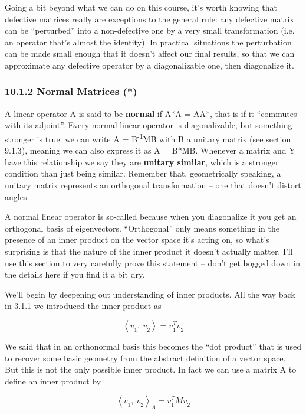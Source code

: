 \documentclass[oneside,english]{amsbook}
\numberwithin{section}{chapter}
\theoremstyle{plain}
\theoremstyle{definition}
\begin{document}
Going a bit beyond what we can do on this course, it's worth knowing
that defective matrices really are exceptions to the general rule: any
defective matrix can be ``perturbed'' into a non-defective one by a very
small transformation (i.e. an operator that's almost the identity). In
practical situations the perturbation can be made small enough that it
doesn't affect our final results, so that we can approximate any
defective operator by a diagonalizable one, then diagonalize it.

\subsubsection{10.1.2 Normal Matrices (*)}\label{normal-matrices}

A linear operator A is said to be \textbf{normal} if A*A = AA*, that is
if it ``commutes with its adjoint''. Every normal linear operator is
diagonalizable, but something stronger is true: we can write A =
B\textsuperscript{-1}MB with B a unitary matrix (see section 9.1.3),
meaning we can also express it as A = B*MB. Whenever a matrix and Y have
this relationship we say they are \textbf{unitary similar}, which is a
stronger condition than just being similar. Remember that, geometrically
speaking, a unitary matrix represents an orthogonal transformation --
one that doesn't distort angles.

A normal linear operator is so-called because when you diagonalize it
you get an orthogonal basis of eigenvectors. ``Orthogonal'' only means
something in the presence of an inner product on the vector space it's
acting on, so what's surprising is that the nature of the inner product
it doesn't actually matter. I'll use this section to very carefully
prove this statement -- don't get bogged down in the details here if you
find it a bit dry.

We'll begin by deepening out understanding of inner products. All the
way back in 3.1.1 we introduced the inner product as

\[\left\langle {\underline{v}}_{1},\ {\underline{v}}_{2} \right\rangle = {\underline{v}}_{1}^{T}{\underline{v}}_{2}\]

We said that in an orthonormal basis this becomes the ``dot product''
that is used to recover some basic geometry from the abstract definition
of a vector space. But this is not the only possible inner product. In
fact we can use a matrix A to define an inner product by

\[\left\langle {\underline{v}}_{1},\ {\underline{v}}_{2} \right\rangle_{A} = {\underline{v}}_{1}^{T}{M\underline{v}}_{2}\]
\end{document}
